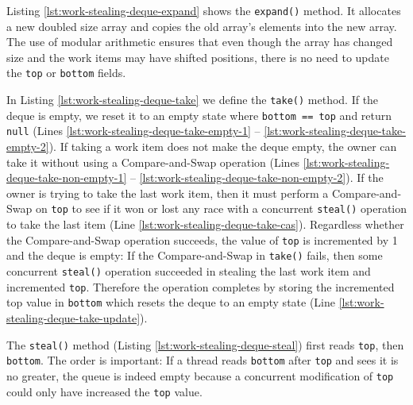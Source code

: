 

Listing \ref{lst:work-stealing-deque-expand} shows the
\lstinline!expand()! method. It allocates a new doubled size array and
copies the old array's elements into the new array. The use of modular
arithmetic ensures that even though the array has changed size and the
work items may have shifted positions, there is no need to update the
\lstinline!top! or \lstinline!bottom! fields.



In Listing \ref{lst:work-stealing-deque-take} we define the
\lstinline!take()! method. If the deque is empty, we reset it to an
empty state where \lstinline!bottom == top! and return
\lstinline!null! (Lines \ref{lst:work-stealing-deque-take-empty-1} --
\ref{lst:work-stealing-deque-take-empty-2}). If taking a work item
does not make the deque empty, the owner can take it without using a
Compare-and-Swap operation (Lines
\ref{lst:work-stealing-deque-take-non-empty-1} --
\ref{lst:work-stealing-deque-take-non-empty-2}). If the owner is
trying to take the last work item, then it must perform a
Compare-and-Swap on \lstinline!top! to see if it won or lost any race
with a concurrent \lstinline!steal()! operation to take the last item
(Line \ref{lst:work-stealing-deque-take-cas}). Regardless whether the
Compare-and-Swap operation succeeds, the value of \lstinline!top! is
incremented by 1 and the deque is empty: If the Compare-and-Swap in
\lstinline!take()! fails, then some concurrent \lstinline!steal()!
operation succeeded in stealing the last work item and incremented
\lstinline!top!. Therefore the operation completes by storing the
incremented top value in \lstinline!bottom! which resets the deque to
an empty state (Line \ref{lst:work-stealing-deque-take-update}).



The \lstinline!steal()! method (Listing
\ref{lst:work-stealing-deque-steal}) first reads \lstinline!top!, then
\lstinline!bottom!. The order is important: If a thread reads
\lstinline!bottom! after \lstinline!top! and sees it is no greater,
the queue is indeed empty because a concurrent modification of
\lstinline!top! could only have increased the \lstinline!top! value.

